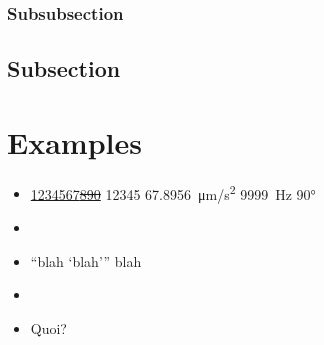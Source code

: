 \documentclass[a4paper, 11pt]{lt_article}
\begin{document}
\subsubsection{Subsubsection}
\Blindtext[1]

\subsection{Subsection} %

\Blindtext[2]


\newpage
\section{Examples} %

\textrm{\blindtext}

\textit{\blindtext}

\textbf{\blindtext}

\textsc{\blindtext}

\newpage

\textsf{\blindtext}

\textsf{\textit{\blindtext}}

\textsf{\textbf{\blindtext}}

\texttt{\blindtext}

\newpage

\begin{itemize}

    \item \uline{1234567\sout{890}} \num{12345} \SI{67.8956}{\um/\s^2}
        \SI{9999}{\hertz} \ang{90}

    \item \LuaTeX

    \item \enquote{blah \enquote{blah}} blah

    \item \eg \ie \cf \etc

    \item Quoi?

\end{itemize}

\end{document}

